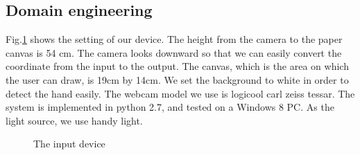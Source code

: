 \subsection{Domain engineering}
Fig.\ref{fig:1} shows the setting of our device. The height from the camera to the paper canvas is 54 cm. The camera looks downward so that we can easily convert the coordinate from the input to the output. The canvas, which is the area on which the user can draw, is 19cm by 14cm. We set the  background to white in order to detect the hand easily. The webcam model we use is logicool carl zeiss tessar. The system is implemented in python 2.7, and tested on a Windows 8 PC. As the light source, we use handy light. 
\begin{figure}
  \centering
 
 \caption{The input device}
 \label{fig:1}
\end{figure}
\clearpage
\clearpage
